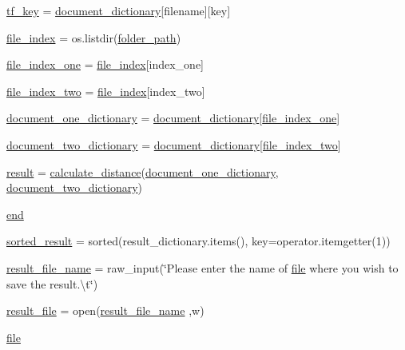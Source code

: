 \begin{DoxyCompactItemize}
\item 
\hyperlink{namespacediff_ab860e167471d632882c770f12e87927e}{tf\+\_\+key} = \hyperlink{namespacediff_a7d02a567fcd601900d3960bef0191cea}{document\+\_\+dictionary}\mbox{[}filename\mbox{]}\mbox{[}key\mbox{]}
\item 
\hyperlink{namespacediff_a9c223d5f0415c68743de6a689c3bea0b}{file\+\_\+index} = os.\+listdir(\hyperlink{namespacediff_adccd64c100d50ed0e87d46c33e8636eb}{folder\+\_\+path})
\item 
\hyperlink{namespacediff_ac8ee8a35e457d5004c0f85b0383faf26}{file\+\_\+index\+\_\+one} = \hyperlink{namespacediff_a9c223d5f0415c68743de6a689c3bea0b}{file\+\_\+index}\mbox{[}index\+\_\+one\mbox{]}
\item 
\hyperlink{namespacediff_a6f1ee631f8bf5af8ef567c3e029b0e6b}{file\+\_\+index\+\_\+two} = \hyperlink{namespacediff_a9c223d5f0415c68743de6a689c3bea0b}{file\+\_\+index}\mbox{[}index\+\_\+two\mbox{]}
\item 
\hyperlink{namespacediff_aa4da046a613de2dafe03d105bca31694}{document\+\_\+one\+\_\+dictionary} = \hyperlink{namespacediff_a7d02a567fcd601900d3960bef0191cea}{document\+\_\+dictionary}\mbox{[}\hyperlink{namespacediff_ac8ee8a35e457d5004c0f85b0383faf26}{file\+\_\+index\+\_\+one}\mbox{]}
\item 
\hyperlink{namespacediff_a00ac707250a54a82a970c2bb2acf736a}{document\+\_\+two\+\_\+dictionary} = \hyperlink{namespacediff_a7d02a567fcd601900d3960bef0191cea}{document\+\_\+dictionary}\mbox{[}\hyperlink{namespacediff_a6f1ee631f8bf5af8ef567c3e029b0e6b}{file\+\_\+index\+\_\+two}\mbox{]}
\item 
\hyperlink{namespacediff_a5df2e8041c6fff30558b49edee35438a}{result} = \hyperlink{namespacediff_a0b1fc82894743728455b31d3e9ec3671}{calculate\+\_\+distance}(\hyperlink{namespacediff_aa4da046a613de2dafe03d105bca31694}{document\+\_\+one\+\_\+dictionary}, \hyperlink{namespacediff_a00ac707250a54a82a970c2bb2acf736a}{document\+\_\+two\+\_\+dictionary})
\item 
\hyperlink{namespacediff_a2839fdf2e0df35c347f0649098c5ecdc}{end}
\item 
\hyperlink{namespacediff_a3b4c2771da02846b61219801d8016b40}{sorted\+\_\+result} = sorted(result\+\_\+dictionary.\+items(), key=operator.\+itemgetter(1))
\item 
\hyperlink{namespacediff_a15a863df81a6f3099b088f9f52808389}{result\+\_\+file\+\_\+name} = raw\+\_\+input(\char`\"{}Please enter the name of \hyperlink{namespacediff_a3759e132757b6fdecd117a665d6158ab}{file} where you wish to save the result.\textbackslash{}t\char`\"{})
\item 
\hyperlink{namespacediff_aa1be62f435ce37ca93ba61d4ad88c0c9}{result\+\_\+file} = open(\hyperlink{namespacediff_a15a863df81a6f3099b088f9f52808389}{result\+\_\+file\+\_\+name} ,\textquotesingle{}w\textquotesingle{})
\item 
\hyperlink{namespacediff_a3759e132757b6fdecd117a665d6158ab}{file}
\end{DoxyCompactItemize}


